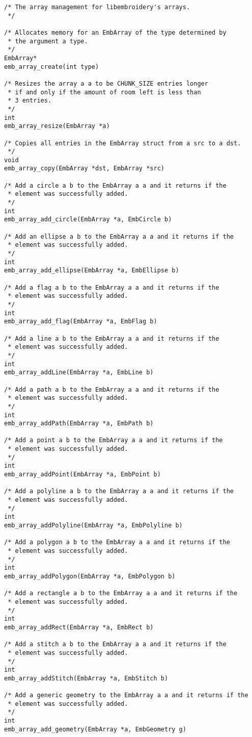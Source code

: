 \begin{lstlisting}
/* The array management for libembroidery's arrays.
 */

/* Allocates memory for an EmbArray of the type determined by
 * the argument a type.
 */
EmbArray*
emb_array_create(int type)

/* Resizes the array a a to be CHUNK_SIZE entries longer
 * if and only if the amount of room left is less than
 * 3 entries.
 */
int
emb_array_resize(EmbArray *a)

/* Copies all entries in the EmbArray struct from a src to a dst.
 */
void
emb_array_copy(EmbArray *dst, EmbArray *src)

/* Add a circle a b to the EmbArray a a and it returns if the
 * element was successfully added.
 */
int
emb_array_add_circle(EmbArray *a, EmbCircle b)

/* Add an ellipse a b to the EmbArray a a and it returns if the
 * element was successfully added.
 */
int
emb_array_add_ellipse(EmbArray *a, EmbEllipse b)

/* Add a flag a b to the EmbArray a a and it returns if the
 * element was successfully added.
 */
int
emb_array_add_flag(EmbArray *a, EmbFlag b)

/* Add a line a b to the EmbArray a a and it returns if the
 * element was successfully added.
 */
int
emb_array_addLine(EmbArray *a, EmbLine b)

/* Add a path a b to the EmbArray a a and it returns if the
 * element was successfully added.
 */
int
emb_array_addPath(EmbArray *a, EmbPath b)

/* Add a point a b to the EmbArray a a and it returns if the
 * element was successfully added.
 */
int
emb_array_addPoint(EmbArray *a, EmbPoint b)

/* Add a polyline a b to the EmbArray a a and it returns if the
 * element was successfully added.
 */
int
emb_array_addPolyline(EmbArray *a, EmbPolyline b)

/* Add a polygon a b to the EmbArray a a and it returns if the
 * element was successfully added.
 */
int
emb_array_addPolygon(EmbArray *a, EmbPolygon b)

/* Add a rectangle a b to the EmbArray a a and it returns if the
 * element was successfully added.
 */
int
emb_array_addRect(EmbArray *a, EmbRect b)

/* Add a stitch a b to the EmbArray a a and it returns if the
 * element was successfully added.
 */
int
emb_array_addStitch(EmbArray *a, EmbStitch b)

/* Add a generic geometry to the EmbArray a a and it returns if the
 * element was successfully added.
 */
int
emb_array_add_geometry(EmbArray *a, EmbGeometry g)


\end{lstlisting}
